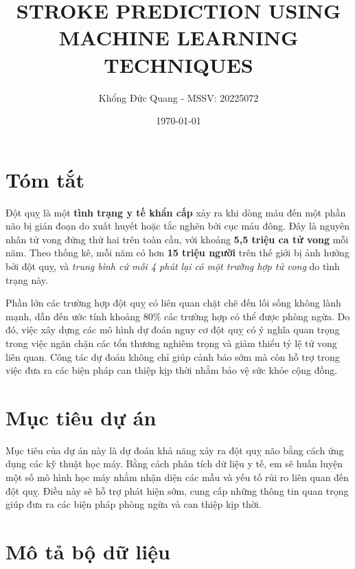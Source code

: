 \documentclass[11pt]{article}
\title{STROKE PREDICTION USING MACHINE LEARNING TECHNIQUES}
\author{Khổng Đức Quang - MSSV: 20225072}
\date{\today}
\begin{document}
	\maketitle
	
	\section{Tóm tắt}
	
	
	
	\hspace{0.6cm}Đột quỵ là một \textbf{tình trạng y tế khẩn cấp} xảy ra khi dòng máu đến một phần não bị gián đoạn do xuất huyết hoặc tắc nghẽn bởi cục máu đông. Đây là nguyên nhân tử vong đứng thứ hai trên toàn cầu, với khoảng \textbf{5,5 triệu ca tử vong} mỗi năm. Theo thống kê, mỗi năm có hơn \textbf{15 triệu người} trên thế giới bị ảnh hưởng bởi đột quỵ, và \textit{trung bình cứ mỗi 4 phút lại có một trường hợp tử vong} do tình trạng này.
	\vspace{0.3cm}
	
 	Phần lớn các trường hợp đột quỵ có liên quan chặt chẽ đến lối sống không lành mạnh, dẫn đến ước tính khoảng 80\% các trường hợp có thể được phòng ngừa. Do đó, việc xây dựng các mô hình dự đoán nguy cơ đột quỵ có ý nghĩa quan trọng trong việc ngăn chặn các tổn thương nghiêm trọng và giảm thiểu tỷ lệ tử vong liên quan. Công tác dự đoán không chỉ giúp cảnh báo sớm mà còn hỗ trợ trong việc đưa ra các biện pháp can thiệp kịp thời nhằm bảo vệ sức khỏe cộng đồng.
	
	\section{Mục tiêu dự án}
	
	\hspace{0.6cm}Mục tiêu của dự án này là dự đoán khả năng xảy ra đột quỵ não bằng cách ứng dụng các kỹ thuật học máy. Bằng cách phân tích dữ liệu y tế, em sẽ huấn luyện một số mô hình học máy nhằm nhận diện các mẫu và yếu tố rủi ro liên quan đến đột quỵ. Điều này sẽ hỗ trợ phát hiện sớm, cung cấp những thông tin quan trọng giúp đưa ra các biện pháp phòng ngừa và can thiệp kịp thời.
	\pagebreak
	
	\tableofcontents
	
	
	\pagebreak
	
	\listoffigures
	
	\pagebreak
	\section{Mô tả bộ dữ liệu}
	
\end{document}
